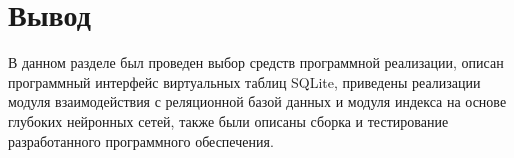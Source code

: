 
\section*{Вывод}

В данном разделе был проведен выбор средств программной реализации, описан
программный интерфейс виртуальных таблиц SQLite, приведены реализации модуля
взаимодействия с реляционной базой данных и модуля индекса на основе глубоких
нейронных сетей, также были описаны сборка и тестирование разработанного
программного обеспечения.

